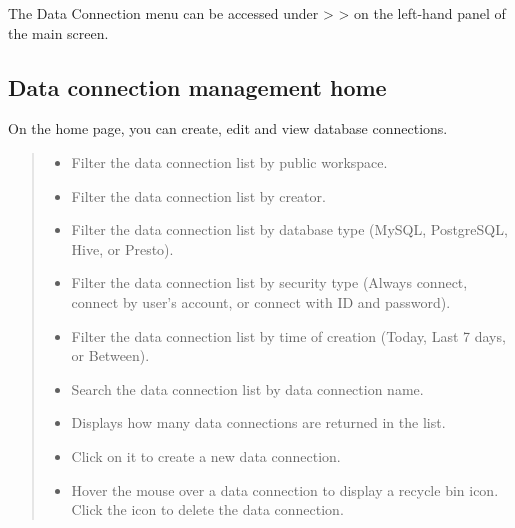 \documentclass[letterpaper,10pt,english]{sphinxmanual}
\begin{document}
The Data Connection menu can be accessed under  \textgreater{}  \textgreater{}  on the left-hand panel of the main screen.
\begin{quote}

\begin{figure}[H]
\centering

\noindent{}
\end{figure}
\end{quote}


\subsection{Data connection management home}
\label{\detokenize{discovery/part02/data_connection:id2}}
On the  home page, you can create, edit and view database connections.
\begin{quote}

\begin{figure}[H]
\centering

\noindent{}
\end{figure}
\begin{itemize}
\item {} 
 Filter the data connection list by public workspace.

\item {} 
 Filter the data connection list by creator.

\item {} 
 Filter the data connection list by database type (MySQL, PostgreSQL, Hive, or Presto).

\item {} 
 Filter the data connection list by security type (Always connect, connect by user’s account, or connect with ID and password).

\item {} 
 Filter the data connection list by time of creation (Today, Last 7 days, or Between).

\item {} 
 Search the data connection list by data connection name.

\item {} 
 Displays how many data connections are returned in the list.

\item {} 
 Click on it to create a new data connection.

\item {} 
 Hover the mouse over a data connection to display a recycle bin icon. Click the icon to delete the data connection.

\end{itemize}
\end{quote}
\end{document}
